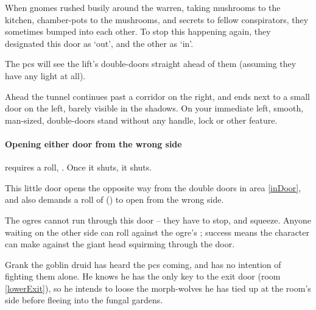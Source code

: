 
\begin{exampletext}
  When gnomes rushed busily around the \gls{warren}, taking mushrooms to the kitchen, chamber-pots to the mushrooms, and secrets to fellow conspirators, they sometimes bumped into each other.
  To stop this happening again, they designated this door as `out', and the other as `in'.
\end{exampletext}

The \glspl{pc} will see the lift's double-doors straight ahead of them (assuming they have any light at all).

\begin{boxtext}
  Ahead the tunnel continues past a corridor on the right, and ends next to a small door on the left, barely visible in the shadows.
  On your immediate left, smooth, man-sized, double-doors stand without any handle, lock or other feature.
\end{boxtext}

\paragraph{Opening either door from the wrong side}
requires a  roll, \tn[10].
Once it shuts, it shuts.


This little door opens the opposite way from the double doors in area \ref{inDoor}, and also demands a roll of  (\tn[10]) to open from the wrong side.

The \glspl{ogre} cannot run through this door -- they have to stop, and squeeze.
Anyone waiting on the other side can roll  against the ogre's ; success means the character can make  against the giant head squirming through the door.%



Grank the goblin druid has heard the \glspl{pc} coming, and has no intention of fighting them alone.
He knows he has the only key to the exit door (room \ref{lowerExit}), so he intends to loose the morph-wolves he has tied up at the room's side before fleeing into the fungal gardens.

